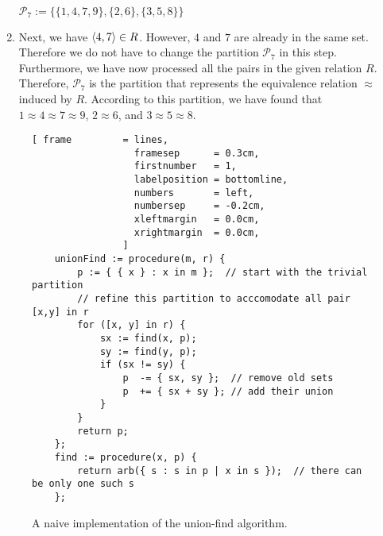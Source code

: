 \begin{enumerate}
      \\[0.2cm]
      \hspace*{1.3cm}
      $\mathcal{P}_7 := \bigl\{ \{1, 4, 7, 9\}, \{2,6\}, \{3,5,8\} \bigr\}$
\item Next, we have $\pair(4,7) \in R$.  However, $4$ and $7$ are already in the same set.
      Therefore we do not have to change the partition $\mathcal{P}_7$ in this step.
      Furthermore, we have now processed all the pairs in the given relation $R$.
      Therefore, $\mathcal{P}_7$ is the partition that represents the equivalence relation $\approx$ induced
      by $R$.  According to this partition, we have found that
      \\[0.2cm]
      \hspace*{1.3cm}
      $1 \approx 4 \approx 7 \approx 9$, \quad $2 \approx 6$,  \quad and \quad $3 \approx 5 \approx 8$.
\end{enumerate}
 

\begin{figure}[!ht]
\centering
\begin{Verbatim}[ frame         = lines, 
                  framesep      = 0.3cm, 
                  firstnumber   = 1,
                  labelposition = bottomline,
                  numbers       = left,
                  numbersep     = -0.2cm,
                  xleftmargin   = 0.0cm,
                  xrightmargin  = 0.0cm,
                ]
    unionFind := procedure(m, r) {
        p := { { x } : x in m };  // start with the trivial partition
        // refine this partition to acccomodate all pair [x,y] in r
        for ([x, y] in r) {
            sx := find(x, p);
            sy := find(y, p);
            if (sx != sy) {
                p  -= { sx, sy };  // remove old sets
                p  += { sx + sy }; // add their union
            }
        }
        return p;
    };
    find := procedure(x, p) {
        return arb({ s : s in p | x in s });  // there can be only one such s
    };
\end{Verbatim}
\vspace*{-0.3cm}
\caption{A naive implementation of the union-find algorithm.}
\label{fig:union-find-naive.stlx}
\end{figure}

